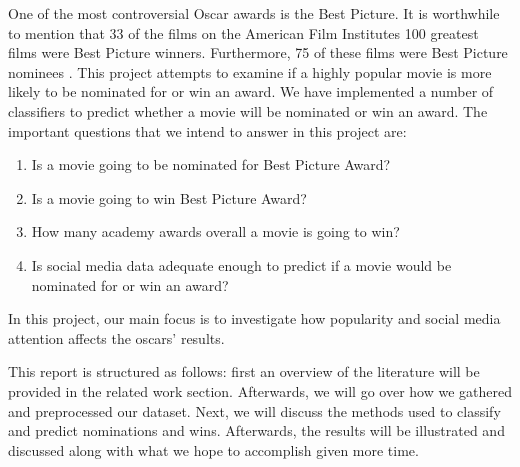 \documentclass[journal,transmag]{IEEEtran}
\begin{document}
	One of the most controversial Oscar awards is the Best Picture.
	It is worthwhile to mention that 33 of the films on the American Film Institute\textquotesingle s 100 greatest films were Best Picture winners. Furthermore, 75 of these films were  Best Picture nominees \cite{maryamref20}.
	This project attempts to examine if a highly popular movie is more likely to be nominated for or win an award.  We have implemented a number of classifiers to predict whether a movie will be nominated or win an award. The important questions that we intend to answer in this project are:	
	\begin{enumerate}
		\item Is a movie going to be nominated for Best Picture Award?
		\item Is a movie going to win Best Picture Award?
		\item How many academy awards overall a movie is going to win?
		\item Is social media data adequate enough to predict if a movie would be nominated for or win an award?
	\end{enumerate}	
	In this project, our main focus is to investigate how popularity and social media attention affects the oscars' results.
	\par
	This report is structured as follows: first an overview of the literature will be provided in the related work section. Afterwards, we will go over how we gathered and preprocessed our dataset. Next, we will discuss the methods used to classify and predict nominations and wins. Afterwards, the results will be illustrated and discussed along with what we hope to accomplish given more time.
	
\end{document}
